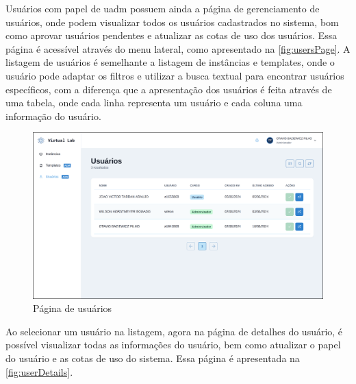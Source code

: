 Usuários com papel de \gls{uadm} possuem ainda a página de gerenciamento de usuários, onde podem visualizar todos os usuários cadastrados no sistema, bom como aprovar usuários pendentes e atualizar as cotas de uso dos usuários. Essa página é acessível através do menu lateral, como apresentado na \autoref{fig:usersPage}. A listagem de usuários é semelhante a listagem de instâncias e templates, onde o usuário pode adaptar os filtros e utilizar a busca textual para encontrar usuários específicos, com a diferença que a apresentação dos usuários é feita através de uma tabela, onde cada linha representa um usuário e cada coluna uma informação do usuário.

\begin{figure}[H]
\caption{Página de usuários}
\label{fig:usersPage}
\includegraphics[width=\textwidth]{capitulos/3-resultados/files/users.png}
\end{figure}

Ao selecionar um usuário na listagem, agora na página de detalhes do usuário, é possível visualizar todas as informações do usuário, bem como atualizar o papel do usuário e as cotas de uso do sistema. Essa página é apresentada na \autoref{fig:userDetails}.


